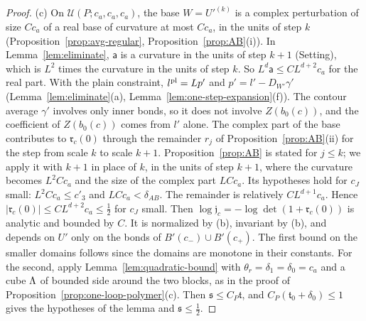 \begin{proof}
(c) On $\mathcal U(P;c_a,c_a,c_a)$, the base $W=U'^{(k)}$ is a complex perturbation of size $Cc_a$ of a real base of curvature at most $Cc_a$, in the units of step $k$ (Proposition~\ref{prop:avg-regular}, Proposition~\ref{prop:AB}(i)). In Lemma~\ref{lem:eliminate}, $\mathsf a$ is a curvature in the units of step $k+1$ (Setting), which is $L^2$ times the curvature in the units of step $k$. So $L^d\mathsf a\le CL^{d+2}c_a$ for the real part. With the plain constraint, $l^{\rm pl}=Lp'$ and $p'=l'-D_{W'}\gamma'$ (Lemma~\ref{lem:eliminate}(a), Lemma~\ref{lem:one-step-expansion}(f)). The contour average $\gamma'$ involves only inner bonds, so it does not involve $Z(b_0(c))$, and the coefficient of $Z(b_0(c))$ comes from $l'$ alone. The complex part of the base contributes to $\mathfrak r_c(0)$ through the remainder $r_j$ of Proposition~\ref{prop:AB}(ii) for the step from scale $k$ to scale $k+1$. Proposition~\ref{prop:AB} is stated for $j\le k$; we apply it with $k+1$ in place of $k$, in the units of step $k+1$, where the curvature becomes $L^2Cc_a$ and the size of the complex part $LCc_a$. Its hypotheses hold for $c_J$ small: $L^2Cc_a\le c'_3$ and $LCc_a<\delta_{AB}$. The remainder is relatively $CL^{d+1}c_a$. Hence $|\mathfrak r_c(0)|\le CL^{d+2}c_a\le\frac12$ for $c_J$ small. Then $\log\mathfrak j_c=-\log\det(1+\mathfrak r_c(0))$ is analytic and bounded by $C$. It is normalized by (b), invariant by (b), and depends on $U'$ only on the bonds of $B'(c_-)\cup B'(c_+)$. The first bound on the smaller domains follows since the domains are monotone in their constants. For the second, apply Lemma~\ref{lem:quadratic-bound} with $\theta_r=\delta_1=\delta_0=c_a$ and a cube $\Lambda$ of bounded side around the two blocks, as in the proof of Proposition~\ref{prop:one-loop-polymer}(c). Then $\mathfrak s\le C_P\mathfrak t$, and $C_P(\mathfrak t_0+\delta_0)\le1$ gives the hypotheses of the lemma and $\mathfrak s\le\frac12$.


\end{proof}
